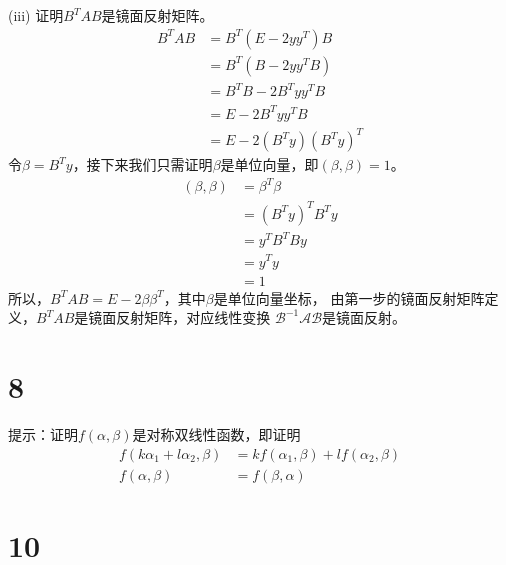 \documentclass{article}
\begin{document}
(iii) 证明$B^T A B$是镜面反射矩阵。
\begin{align*}
  B^T A B & = B^T (E - 2 y y^T) B    \\
          & = B^T(B - 2 y y^T B)     \\
          & = B^T B - 2 B^T y y^T B  \\
          & = E - 2 B^T y y^T B      \\
          & = E - 2 (B^T y)(B^T y)^T
\end{align*}
令$\beta = B^T y$，接下来我们只需证明$\beta$是单位向量，即$(\beta, \beta) = 1$。
\begin{align*}
  (\beta, \beta) & = \beta^T \beta   \\
                 & = (B^T y)^T B^T y \\
                 & = y^T B^T B y     \\
                 & = y^T y           \\
                 & = 1
\end{align*}
所以，$ B^T A B = E - 2 \beta \beta^T$，其中$\beta$是单位向量坐标，
由第一步的镜面反射矩阵定义，$B^T A B$是镜面反射矩阵，对应线性变换
$\mathscr{B}^{-1} \mathscr{A} \mathscr{B}$是镜面反射。

\section*{8}

提示：证明$f(\alpha, \beta)$是对称双线性函数，即证明
\begin{align*}
  f(k\alpha_1 + l \alpha_2, \beta) & = kf(\alpha_1, \beta) + lf(\alpha_2, \beta) \\
  f(\alpha, \beta)                 & = f(\beta, \alpha)
\end{align*}

\section*{10}
\end{document}
